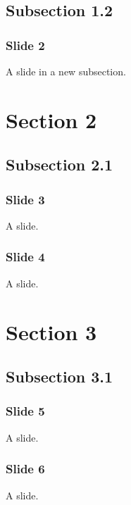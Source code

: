 \documentclass[t,english]{beamer}
\begin{document}
\subsection*{Subsection 1.2}

\begin{frame}[fragile]
\frametitle{Slide 2}


A slide in a new subsection.
\end{frame}



\section*{Section 2}



\subsection*{Subsection 2.1}

\begin{frame}[fragile]
\frametitle{Slide 3}


A slide.
\end{frame}

\begin{frame}[fragile]
\frametitle{Slide 4}


A slide.
\end{frame}



\section*{Section 3}



\subsection*{Subsection 3.1}

\begin{frame}[fragile]
\frametitle{Slide 5}


A slide.
\end{frame}

\begin{frame}[fragile]
\frametitle{Slide 6}


A slide.
\end{frame}
\end{document}
